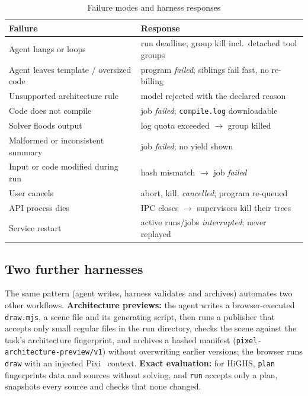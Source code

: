 \documentclass[conference]{IEEEtran}
\newcommand{\code}[1]{\texttt{\small #1}}
\begin{document}
\begin{table}[t]
\centering
\caption{Failure modes and harness responses}
\label{tab:failures}
\setlength{\tabcolsep}{3pt}
\renewcommand{\arraystretch}{1.05}
\begin{tabular}{p{30mm}p{52mm}}
\toprule
Failure & Response \\
\midrule
Agent hangs or loops & run deadline; group kill incl.\ detached tool groups \\
Agent leaves template / oversized code & program \emph{failed}; siblings fail fast, no re-billing \\
Unsupported architecture rule & model rejected with the declared reason \\
Code does not compile & job \emph{failed}; \code{compile.log} downloadable \\
Solver floods output & log quota exceeded $\rightarrow$ group killed \\
Malformed or inconsistent summary & job \emph{failed}; no yield shown \\
Input or code modified during run & hash mismatch $\rightarrow$ job \emph{failed} \\
User cancels & abort, kill, \emph{cancelled}; program re-queued \\
API process dies & IPC closes $\rightarrow$ supervisors kill their trees \\
Service restart & active runs/jobs \emph{interrupted}; never replayed \\
\bottomrule
\end{tabular}
\end{table}

\subsection{Two further harnesses}
The same pattern (agent writes, harness validates and archives) automates
two other workflows. \textbf{Architecture previews:} the agent writes a
browser-executed \code{draw.mjs}, a scene file and its generating script,
then runs a publisher that accepts only small regular files in the run
directory, checks the scene against the task's architecture fingerprint,
and archives a hashed manifest (\code{pixel-architecture-preview/v1})
without overwriting earlier versions; the browser runs \code{draw} with an
injected Pixi~\cite{pixi} context. \textbf{Exact evaluation:} for HiGHS,
\code{plan} fingerprints data and sources without solving, and \code{run}
accepts only a plan, snapshots every source and checks that none changed.
\end{document}
